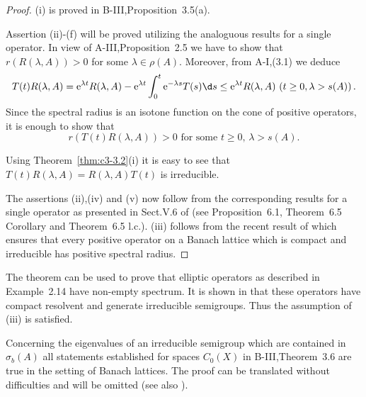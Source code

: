 \begin{proof}
	(i) is proved in B-III,Proposition~3.5(a).
	
	Assertion (ii)-(f) will be proved utilizing the analoguous results for a single operator.
	In view of A-III,Proposition~2.5 we have to show that $r(R(\lambda,A)) > 0$ for some $\lambda \in \rho(A)$.
	Moreover, from A-I,(3.1) we deduce
	\begin{align*}
		T(t)R(\lambda,A) = \mathrm{e}^{\lambda t}R(\lambda,A) - \mathrm{e}^{\lambda t}\int_{0}^{t} \mathrm{e}^{-\lambda s}T(s)\d s \leq \mathrm{e}^{\lambda t}R(\lambda,A) \ (t\geq 0, \lambda>s(A))\,.
	\end{align*}
	Since the spectral radius is an isotone function on the cone of positive operators, it is enough to show that
	\begin{equation}\label{eq:c3-3.12}
		r(T(t)R(\lambda,A)) > 0 \text{ for some } t \geq 0,\, \lambda > s(A).
	\end{equation}
	
	Using Theorem~\ref{thm:c3-3.2}(i) it is easy to see that $T(t)R(\lambda,A) = R(\lambda,A)T(t)$ is irreducible.
	
	The assertions (ii),(iv) and (v) now follow from the corresponding results for a single operator as presented in Sect.V.6 of \citet{schaefer:1974} (see Proposition~6.1, Theorem~6.5 Corollary and Theorem~6.5 l.c.).
	(iii) follows from the recent result of \citet{depagter:1986} which ensures that every positive operator on a Banach lattice which is compact and irreducible has positive spectral radius.
\end{proof}

The theorem can be used to prove that elliptic operators as described in Example~2.14 have non-empty spectrum.
It is shown in \citet{amann:1983} that these operators have compact resolvent and generate irreducible semigroups.
Thus the assumption of (iii) is satisfied.

Concerning the eigenvalues of an irreducible semigroup which are contained in $\sigma_{b}(A)$ all statements established for spaces $C_{0}(X)$ in B-III,Theorem~3.6 are true in the setting of Banach lattices.
The proof can be translated without difficulties and will be omitted (see also \citet[Theorem~2.6]{greiner:1982}).

